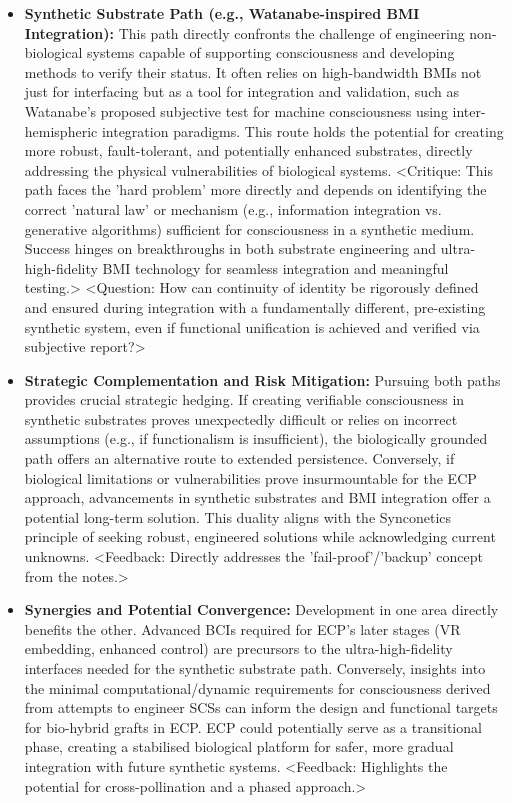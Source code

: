 \documentclass[10pt]{article}
\begin{document}
\begin{sloppypar}
\begin{itemize}
    \item \textbf{Synthetic Substrate Path (e.g., Watanabe-inspired BMI Integration):} This path directly confronts the challenge of engineering non-biological systems capable of supporting consciousness and developing methods to verify their status. It often relies on high-bandwidth BMIs not just for interfacing but as a tool for integration and validation, such as Watanabe's proposed subjective test for machine consciousness using inter-hemispheric integration paradigms. This route holds the potential for creating more robust, fault-tolerant, and potentially enhanced substrates, directly addressing the physical vulnerabilities of biological systems. <Critique: This path faces the 'hard problem' more directly and depends on identifying the correct 'natural law' or mechanism (e.g., information integration vs. generative algorithms) sufficient for consciousness in a synthetic medium. Success hinges on breakthroughs in both substrate engineering and ultra-high-fidelity BMI technology for seamless integration and meaningful testing.> <Question: How can continuity of identity be rigorously defined and ensured during integration with a fundamentally different, pre-existing synthetic system, even if functional unification is achieved and verified via subjective report?>

    \item \textbf{Strategic Complementation and Risk Mitigation:} Pursuing both paths provides crucial strategic hedging. If creating verifiable consciousness in synthetic substrates proves unexpectedly difficult or relies on incorrect assumptions (e.g., if functionalism is insufficient), the biologically grounded path offers an alternative route to extended persistence. Conversely, if biological limitations or vulnerabilities prove insurmountable for the ECP approach, advancements in synthetic substrates and BMI integration offer a potential long-term solution. This duality aligns with the Synconetics principle of seeking robust, engineered solutions while acknowledging current unknowns. <Feedback: Directly addresses the 'fail-proof'/'backup' concept from the notes.>

    \item \textbf{Synergies and Potential Convergence:} Development in one area directly benefits the other. Advanced BCIs required for ECP's later stages (VR embedding, enhanced control) are precursors to the ultra-high-fidelity interfaces needed for the synthetic substrate path. Conversely, insights into the minimal computational/dynamic requirements for consciousness derived from attempts to engineer SCSs can inform the design and functional targets for bio-hybrid grafts in ECP. ECP could potentially serve as a transitional phase, creating a stabilised biological platform for safer, more gradual integration with future synthetic systems. <Feedback: Highlights the potential for cross-pollination and a phased approach.>


\end{itemize}
\end{sloppypar}
\end{document}
